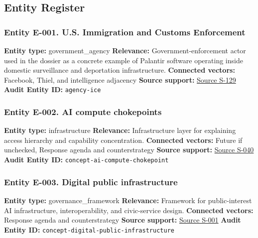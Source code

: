 \documentclass[
  american,
  11pt,
  letterpaper,
]{article}
\begin{document}
\subsection{Entity Register}\label{entity-register}

\subsubsection{Entity E-001. U.S. Immigration and Customs
Enforcement}\label{entity-e-001-u-s-immigration-and-customs-enforcement}

\textbf{Entity type:} government\_agency \textbf{Relevance:}
Government-enforcement actor used in the dossier as a concrete example
of Palantir software operating inside domestic surveillance and
deportation infrastructure. \textbf{Connected vectors:} Facebook, Thiel,
and intelligence adjacency \textbf{Source support:}
\hyperref[source-s-129-what-to-know-about-palantir-the-tech-company-playing-a-key-role-for-ice]{Source
S-129} \textbf{Audit Entity ID:} \texttt{agency-ice}

\subsubsection{Entity E-002. AI compute
chokepoints}\label{entity-e-002-ai-compute-chokepoints}

\textbf{Entity type:} infrastructure \textbf{Relevance:} Infrastructure
layer for explaining access hierarchy and capability concentration.
\textbf{Connected vectors:} Future if unchecked, Response agenda and
counterstrategy \textbf{Source support:}
\hyperref[source-s-040-computing-power-and-the-governance-of-artificial-intelligence]{Source
S-040} \textbf{Audit Entity ID:} \texttt{concept-ai-compute-chokepoint}

\subsubsection{Entity E-003. Digital public
infrastructure}\label{entity-e-003-digital-public-infrastructure}

\textbf{Entity type:} governance\_framework \textbf{Relevance:}
Framework for public-interest AI infrastructure, interoperability, and
civic-service design. \textbf{Connected vectors:} Response agenda and
counterstrategy \textbf{Source support:}
\hyperref[source-s-001-interactions-between-artificial-intelligence-and-digital-public-infrastructure-concepts-benefits-and-challenges]{Source
S-001} \textbf{Audit Entity ID:}
\texttt{concept-digital-public-infrastructure}
\end{document}
